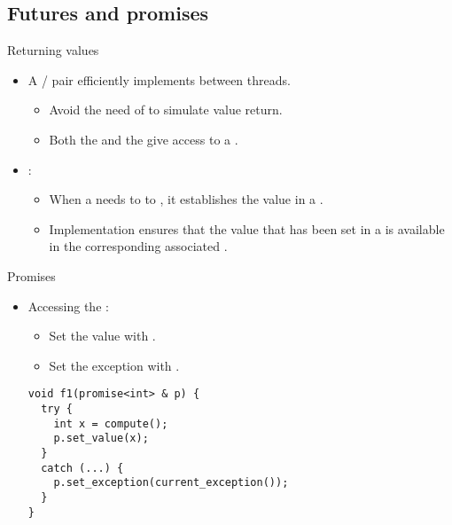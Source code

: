 \subsection{Futures and promises}

\begin{frame}[t]{Returning values}
\begin{itemize}
  \item A / pair efficiently implements
         between threads.
    \begin{itemize}
      \item Avoid the need of 
            to simulate value return.
      \item Both the  and the  give access to
            a .
    \end{itemize}

  \item {}:
    \begin{itemize}
      \item When a  needs to  to
            ,
            it establishes the value in a .
      \item Implementation ensures that the value that has been set in a 
            is available in the corresponding associated .
    \end{itemize}
\end{itemize}
\end{frame}

\begin{frame}[t,fragile]{Promises}
\begin{itemize}
  \item Accessing the :
    \begin{itemize}
      \item Set the value with .
      \item Set the exception with .
    \end{itemize}

\begin{lstlisting}
void f1(promise<int> & p) {
  try {
    int x = compute();
    p.set_value(x);
  }
  catch (...) {
    p.set_exception(current_exception());
  }
}
\end{lstlisting}
\end{itemize}
\end{frame}

